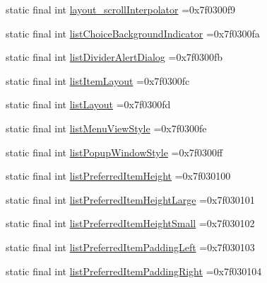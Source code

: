 \begin{DoxyCompactItemize}
\item 
static final int \mbox{\hyperlink{classbr_1_1unb_1_1cic_1_1mp_1_1marketmaster_1_1test_1_1R_1_1attr_a3ed85ad7d36d14a321364fcf5ad9264a}{layout\+\_\+scroll\+Interpolator}} =0x7f0300f9
\item 
static final int \mbox{\hyperlink{classbr_1_1unb_1_1cic_1_1mp_1_1marketmaster_1_1test_1_1R_1_1attr_aa22e20da05b781e511019b58daf56571}{list\+Choice\+Background\+Indicator}} =0x7f0300fa
\item 
static final int \mbox{\hyperlink{classbr_1_1unb_1_1cic_1_1mp_1_1marketmaster_1_1test_1_1R_1_1attr_af1104464b292f182afaebd01d3977ffd}{list\+Divider\+Alert\+Dialog}} =0x7f0300fb
\item 
static final int \mbox{\hyperlink{classbr_1_1unb_1_1cic_1_1mp_1_1marketmaster_1_1test_1_1R_1_1attr_addb3f4aa3469fd31e62def6a01f9193e}{list\+Item\+Layout}} =0x7f0300fc
\item 
static final int \mbox{\hyperlink{classbr_1_1unb_1_1cic_1_1mp_1_1marketmaster_1_1test_1_1R_1_1attr_a9592dd7b119132213ed522e4b2106cce}{list\+Layout}} =0x7f0300fd
\item 
static final int \mbox{\hyperlink{classbr_1_1unb_1_1cic_1_1mp_1_1marketmaster_1_1test_1_1R_1_1attr_a219230c8d4a101404907c7b1a9b7df02}{list\+Menu\+View\+Style}} =0x7f0300fe
\item 
static final int \mbox{\hyperlink{classbr_1_1unb_1_1cic_1_1mp_1_1marketmaster_1_1test_1_1R_1_1attr_a5f7654425873474799bc3e86e448a913}{list\+Popup\+Window\+Style}} =0x7f0300ff
\item 
static final int \mbox{\hyperlink{classbr_1_1unb_1_1cic_1_1mp_1_1marketmaster_1_1test_1_1R_1_1attr_ac5eb19ce9adc6ade927aeb5d4359ac49}{list\+Preferred\+Item\+Height}} =0x7f030100
\item 
static final int \mbox{\hyperlink{classbr_1_1unb_1_1cic_1_1mp_1_1marketmaster_1_1test_1_1R_1_1attr_a8cd517de97bcad120fef75b3a41b38b6}{list\+Preferred\+Item\+Height\+Large}} =0x7f030101
\item 
static final int \mbox{\hyperlink{classbr_1_1unb_1_1cic_1_1mp_1_1marketmaster_1_1test_1_1R_1_1attr_aabd216062d4ef7280a73b3ddc6f1cd5f}{list\+Preferred\+Item\+Height\+Small}} =0x7f030102
\item 
static final int \mbox{\hyperlink{classbr_1_1unb_1_1cic_1_1mp_1_1marketmaster_1_1test_1_1R_1_1attr_ae87d24a296b498e3e5c313b1d76527cb}{list\+Preferred\+Item\+Padding\+Left}} =0x7f030103
\item 
static final int \mbox{\hyperlink{classbr_1_1unb_1_1cic_1_1mp_1_1marketmaster_1_1test_1_1R_1_1attr_a10a838ca6907c9742456c9ca6a3c78af}{list\+Preferred\+Item\+Padding\+Right}} =0x7f030104

\end{DoxyCompactItemize}
